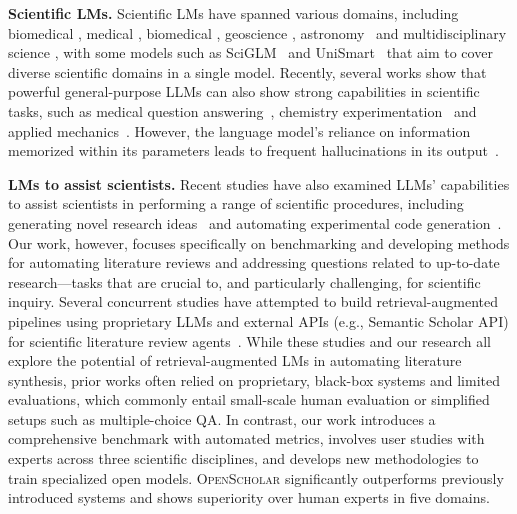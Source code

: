 \documentclass{article} %
\newcommand{\model}{\textsc{OpenScholar}\xspace}
\renewcommand{\paragraph}[1]{\noindent \textbf{#1}}
\begin{document}
\paragraph{Scientific LMs.}
Scientific LMs have spanned various domains, including biomedical \citep{SciFive2021,BioBART2022,BioGPT2022}, medical \citep{singhal2023large,MeLlama2024,PMCLlama2023,Meditron2023}, biomedical \citep{BioMedGPT2023,BioMedGPT2024,BioMistral2024}, geoscience \citep{K22023}, astronomy~\citep{AstroLLaMA2023} and multidisciplinary science \citep{DARWIN2023}, with some models such as SciGLM~\citep{SciGLM2024} and UniSmart~\citep{UniSmart2024} that aim to cover diverse scientific domains in a single model. 
Recently, several works show that powerful general-purpose LLMs can also show strong capabilities in scientific tasks, such as medical question answering~\citep{ai4science2023impact,singhal2023large}, chemistry experimentation~\citep{zheng2023gpt} and applied mechanics~\citep{10.1115/1.4062773}. 
However, the language model's reliance on information memorized within its parameters leads to frequent hallucinations in its output~\citep{li-etal-2024-dawn}. 

\paragraph{LMs to assist scientists.}
Recent studies have also examined LLMs' capabilities to assist scientists in performing a range of scientific procedures, including generating novel research ideas~\citep{baek2024researchagent,Yang2023LargeLM} and automating experimental code generation~\citep{Huang2023MLAgentBenchEL,tian2024scicode}. Our work, however, focuses specifically on benchmarking and developing methods for automating literature reviews and addressing questions related to up-to-date research—tasks that are crucial to, and particularly challenging, for scientific inquiry. 
Several concurrent studies have attempted to build retrieval-augmented pipelines using proprietary LLMs and external APIs (e.g., Semantic Scholar API) for scientific literature review agents~\citep{agarwal2024litllm,skarlinski2024language,wang2024autosurvey}. While these studies and our research all explore the potential of retrieval-augmented LMs in automating literature synthesis, prior works often relied on proprietary, black-box systems and limited evaluations, which commonly entail small-scale human evaluation or simplified setups such as multiple-choice QA. 
In contrast, our work introduces a comprehensive benchmark with automated metrics, involves user studies with experts across three scientific disciplines, and develops new methodologies to train specialized open models. \model significantly outperforms previously introduced systems and shows superiority over human experts in five domains. 
\end{document}

